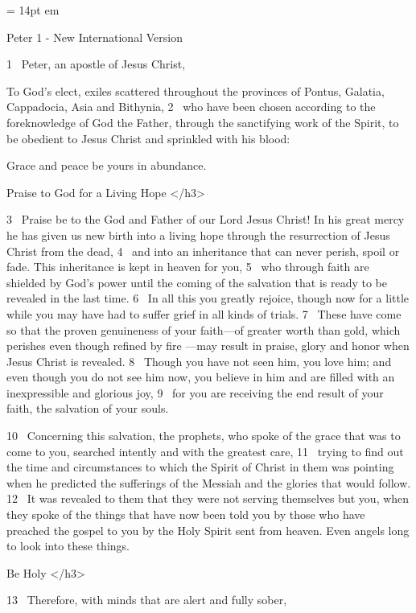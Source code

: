 
\FFrh \baselineskip = 14pt
 em


\centerline{   Peter 1 - New International Version }

\par
1 
Peter, an apostle of Jesus Christ,
\par
To God’s elect,
exiles
scattered
throughout the provinces of Pontus,
Galatia,
Cappadocia, Asia and Bithynia,
2 
who have been chosen according to the foreknowledge
of God the Father, through the sanctifying work of the Spirit,
to be obedient
to Jesus Christ and sprinkled with his blood:
\par
Grace and peace be yours in abundance.
\par
Praise to God for a Living Hope
</h3>
\par
3 
Praise be to the God and Father of our Lord Jesus Christ!
In his great mercy
he has given us new birth
into a living hope
through the resurrection of Jesus Christ from the dead,
4 
and into an inheritance
that can never perish, spoil or fade.
This inheritance is kept in heaven for you,
5 
who through faith are shielded by God’s power
until the coming of the salvation
that is ready to be revealed
in the last time.
6 
In all this you greatly rejoice,
though now for a little while
you may have had to suffer grief in all kinds of trials.
7 
These have come so that the proven genuineness
of your faith—of greater worth than gold, which perishes even though refined by fire
—may result in praise, glory and honor
when Jesus Christ is revealed.
8 
Though you have not seen him, you love him; and even though you do not see him now, you believe in him
and are filled with an inexpressible and glorious joy,
9 
for you are receiving the end result of your faith, the salvation of your souls.
\par
10 
Concerning this salvation, the prophets, who spoke
of the grace that was to come to you,
searched intently and with the greatest care,
11 
trying to find out the time and circumstances to which the Spirit of Christ
in them was pointing when he predicted
the sufferings of the Messiah and the glories that would follow.
12 
It was revealed to them that they were not serving themselves but you,
when they spoke of the things that have now been told you by those who have preached the gospel to you
by the Holy Spirit sent from heaven.
Even angels long to look into these things.
\par
Be Holy
</h3>
\par
13 
Therefore, with minds that are alert and fully sober,

